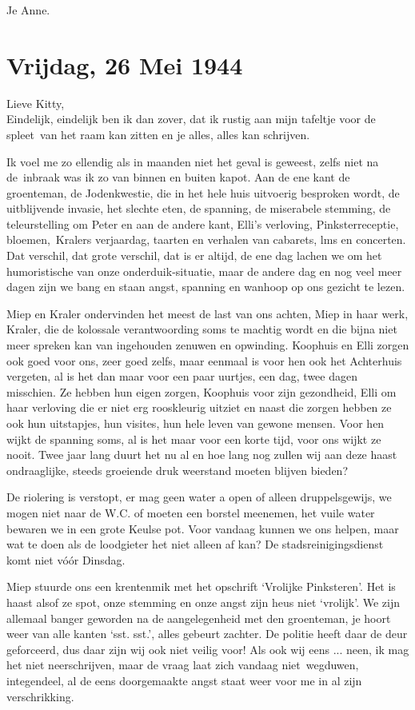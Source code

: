 \documentclass{book}
\begin{document}
Je Anne.

\chapter{Vrijdag, 26 Mei 1944}

Lieve Kitty,\\Eindelijk, eindelijk ben ik dan zover, dat ik rustig aan
mijn tafeltje voor de spleet~van het raam kan zitten en je alles, alles
kan schrijven.

Ik voel me zo ellendig als in maanden niet het geval is geweest, zelfs
niet na de~inbraak was ik zo van binnen en buiten kapot. Aan de ene kant
de groenteman, de Jodenkwestie, die in het hele huis uitvoerig besproken
wordt, de uitblijvende invasie, het slechte eten, de spanning, de
miserabele stemming, de teleurstelling om Peter en aan de andere kant,
Elli's verloving, Pinksterreceptie, bloemen,~Kralers verjaardag, taarten
en verhalen van cabarets, lms en concerten. Dat verschil, dat grote
verschil, dat is er altijd, de ene dag lachen we om het humoristische
van onze onderduik-situatie, maar de andere dag en nog veel meer dagen
zijn we bang en staan angst, spanning en wanhoop op ons gezicht te
lezen.

Miep en Kraler ondervinden het meest de last van ons achten, Miep in
haar werk, Kraler, die de kolossale verantwoording soms te machtig wordt
en die bijna niet meer spreken kan van ingehouden zenuwen en opwinding.
Koophuis en Elli zorgen ook goed voor ons, zeer goed zelfs, maar eenmaal
is voor hen ook het Achterhuis vergeten, al is het dan maar voor een
paar uurtjes, een dag, twee dagen misschien. Ze hebben hun eigen zorgen,
Koophuis voor zijn gezondheid, Elli om haar verloving die er niet erg
rooskleurig uitziet en naast die zorgen hebben ze ook hun uitstapjes,
hun visites, hun hele leven van gewone mensen. Voor hen wijkt de
spanning soms, al is het maar voor een korte tijd, voor ons wijkt ze
nooit. Twee jaar lang duurt het nu al en hoe lang nog zullen wij aan
deze haast ondraaglijke, steeds groeiende druk weerstand moeten blijven
bieden?

De riolering is verstopt, er mag geen water a open of alleen
druppelsgewijs, we mogen niet naar de W.C. of moeten een borstel
meenemen, het vuile water bewaren we in een grote Keulse pot. Voor
vandaag kunnen we ons helpen, maar wat te doen als de loodgieter het
niet alleen af kan? De stadsreinigingsdienst komt niet vóór Dinsdag.

Miep stuurde ons een krentenmik met het opschrift `Vrolijke Pinksteren'.
Het is haast alsof ze spot, onze stemming en onze angst zijn heus niet
`vrolijk'. We zijn allemaal banger geworden na de aangelegenheid met den
groenteman, je hoort weer van alle kanten `sst. sst.', alles gebeurt
zachter. De politie heeft daar de deur geforceerd, dus daar zijn wij ook
niet veilig voor! Als ook wij eens ... neen, ik mag het niet
neerschrijven, maar de vraag laat zich vandaag niet~wegduwen,
integendeel, al de eens doorgemaakte angst staat weer voor me in al zijn
verschrikking.
\end{document}
